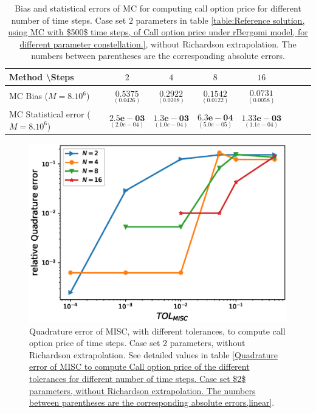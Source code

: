 \begin{table}[h!]
	\centering
	\begin{tabular}{l*{6}{c}r}
		Method \textbackslash  Steps            & $2$ & $4$ & $8$ & $16$  \\
		\hline
		MC Bias ($M=8.10^6$)   & $\underset{(0.0426)}{\mathbf{0.5375
		}}$  & $\underset{ (  0.0208)}{\mathbf{0.2922}}$  & $\underset{(  0.0122)}{\mathbf{0.1542}}$ & $\underset{( 0.0058)}{\mathbf{0.0731}}$  \\	
		
		MC Statistical error ($M=8.10^6$)  & $\underset{( 2.0e-04)}{\mathbf{2.5e-03}}$  & $\underset{(  1.0e-04)}{\mathbf{1.3e-03}}$  & $\underset{(  5.0e-05)}{\mathbf{6.3e-04}}$ & $\underset{(  1.1e-04)}{\mathbf{1.33e-03}}$ \\	
	
		\hline
	\end{tabular}
	\caption{Bias and statistical errors of MC  for computing call option price  for different number of time steps. Case set $2$ parameters in table \ref{table:Reference solution, using MC with $500$ time steps, of Call option price under rBergomi model, for different parameter constellation.}, without Richardson extrapolation. The numbers between parentheses are the corresponding absolute errors.}
	\label{Bias and Statistical errors of MC ($M=10^6$)  for computing Call option price  for different number of time steps. Case set $2$ parameters, without Richardson extrapolation. The numbers between parentheses are the corresponding absolute errors.}
\end{table}





\begin{figure}[h!]
	\centering
	\includegraphics[width=0.5\linewidth]{./figures/rBergomi_MISC_quadratre_error/vs_TOL/set2/relative_quad_error_wrt_MISC_TOL_set2_non_rich_linear}
	
	
	\caption{Quadrature error of MISC, with different tolerances, to compute call option price  of time steps. Case  set $2$ parameters, without Richardson extrapolation.  See detailed values  in table \ref{Quadrature error of MISC to compute Call option price of the different tolerances for different number of time steps. Case  set $2$ parameters, without Richardson extrapolation. The numbers between parentheses are the corresponding absolute errors,linear}.}
	\label{fig:Quadrature_error_set2_linear}
\end{figure}

